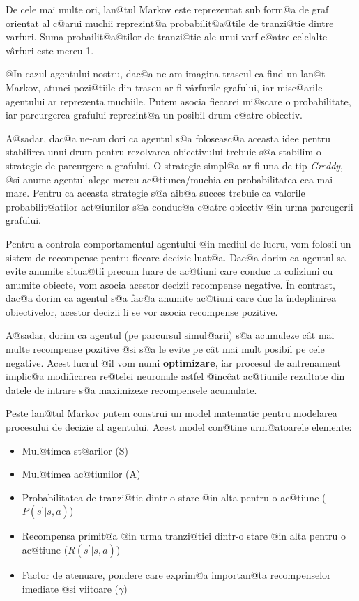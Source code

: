 De cele mai multe ori, lan@tul Markov este reprezentat sub form@a de graf orientat al c@arui muchii reprezint@a probabilit@a@tile de tranzi@tie dintre varfuri. Suma probailit@a@tilor de tranzi@tie ale unui varf c@atre celelalte v\^ arfuri este mereu 1.

@In cazul agentului nostru, dac@a ne-am imagina traseul ca find un lan@t Markov, atunci pozi@tiile din traseu ar fi v\^ arfurile grafului, iar misc@arile agentului ar reprezenta muchiile. Putem asocia fiecarei mi@scare o probabilitate, iar parcurgerea grafului reprezint@a un posibil drum c@atre obiectiv.

A@sadar, dac@a ne-am dori ca agentul s@a foloseasc@a aceasta idee pentru stabilirea unui drum pentru rezolvarea obiectivului trebuie s@a stabilim o strategie de parcurgere a grafului.
O strategie simpl@a ar fi una de tip {\sl Greddy}, @si anume agentul alege mereu ac@tiunea/muchia cu probabilitatea cea mai mare. Pentru ca aceasta strategie s@a aib@a succes trebuie ca valorile probabilit@atilor act@iunilor s@a conduc@a c@atre obiectiv @in urma parcugerii grafului.

Pentru a controla comportamentul agentului @in mediul de lucru, vom folosii un sistem de recompense pentru fiecare decizie luat@a. Dac@a dorim ca agentul sa evite anumite situa@tii precum luare de ac@tiuni care conduc la coliziuni cu anumite obiecte, vom asocia acestor decizii recompense negative. \^In contrast, dac@a dorim ca agentul s@a fac@a anumite ac@tiuni care duc la \^indeplinirea obiectivelor, acestor decizii li se vor asocia recompense pozitive.

A@sadar, dorim ca agentul (pe parcursul simul@arii) s@a acumuleze c\^ at mai multe recompense pozitive @si s@a le evite pe c\^ at mai mult posibil pe cele negative. Acest lucrul @il vom numi \textbf{optimizare}, iar procesul de antrenament implic@a modificarea re@telei neuronale astfel @inc\^ cat ac@tiunile rezultate din datele de intrare s@a maximizeze recompensele acumulate.

Peste lan@tul Markov putem construi un model matematic pentru modelarea procesului de decizie al agentului. Acest model con@tine urm@atoarele elemente:

\begin{itemize}
	\item Mul@timea st@arilor (S)
	\item Mul@timea ac@tiunilor (A)
	\item Probabilitatea de tranzi@tie dintr-o stare @in alta pentru o ac@tiune ($P(s^{\prime}|s, a)$)
	\item Recompensa primit@a @in urma tranzi@tiei dintr-o stare @in alta pentru o ac@tiune ($R(s^{\prime}|s, a)$)
	\item Factor de atenuare, pondere care exprim@a importan@ta recompenselor imediate @si viitoare ($\gamma$)
\end{itemize}

